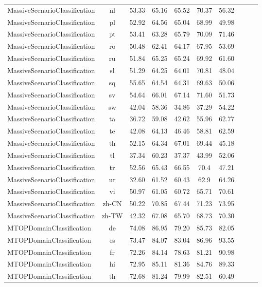 \documentclass[11pt]{article}
\begin{document}
\begin{table*}[t!]
{\begin{tabular}{lc|cccccccc}
MassiveScenarioClassification & nl & 53.33 & 65.16 & 65.52 & 70.37 & 56.32 \\
MassiveScenarioClassification & pl & 52.92 & 64.56 & 65.04 & 68.99 & 49.98 \\
MassiveScenarioClassification & pt & 53.41 & 63.28 & 65.79 & 70.09 & 71.46 \\
MassiveScenarioClassification & ro & 50.48 & 62.41 & 64.17 & 67.95 & 53.69 \\
MassiveScenarioClassification & ru & 51.84 & 65.25 & 65.24 & 69.92 & 61.60 \\
MassiveScenarioClassification & sl & 51.29 & 64.25 & 64.01 & 70.81 & 48.04 \\
MassiveScenarioClassification & sq & 55.65 & 64.54 & 64.31 & 69.63 & 50.06 \\
MassiveScenarioClassification & sv & 54.64 & 66.01 & 67.14 & 71.60 & 51.73 \\
MassiveScenarioClassification & sw & 42.04 & 58.36 & 34.86 & 37.29 & 54.22 \\
MassiveScenarioClassification & ta & 36.72 & 59.08 & 42.62 & 55.96 & 62.77 \\
MassiveScenarioClassification & te & 42.08 & 64.13 & 46.46 & 58.81 & 62.59 \\
MassiveScenarioClassification & th & 52.15 & 64.34 & 67.01 & 69.44 & 45.18 \\
MassiveScenarioClassification & tl & 37.34 & 60.23 & 37.37 & 43.99 & 52.06 \\
MassiveScenarioClassification & tr & 52.56 & 65.43 & 66.55 & 70.4 & 47.21 \\
MassiveScenarioClassification & ur & 32.60 & 61.52 & 60.43 & 62.9 & 64.26 \\
MassiveScenarioClassification & vi & 50.97 & 61.05 & 60.72 & 65.71 & 70.61 \\
MassiveScenarioClassification & zh-CN & 50.22 & 70.85 & 67.44 & 71.23 & 73.95 \\
MassiveScenarioClassification & zh-TW & 42.32 & 67.08 & 65.70 & 68.73 & 70.30 \\
MTOPDomainClassification & de & 74.08 & 86.95 & 79.20 & 85.73 & 82.05 \\
MTOPDomainClassification & es & 73.47 & 84.07 & 83.04 & 86.96 & 93.55 \\
MTOPDomainClassification & fr & 72.26 & 84.14 & 78.63 & 81.21 & 90.98 \\
MTOPDomainClassification & hi & 72.95 & 85.11 & 81.36 & 84.76 & 89.33 \\
MTOPDomainClassification & th & 72.68 & 81.24 & 79.99 & 82.51 & 60.49 \\

\end{tabular}}
\end{table*}
\end{document}
